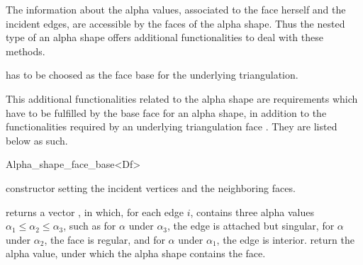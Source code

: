 The information about the alpha values, associated to the face herself and the
incident edges, are accessible by the 
faces of the alpha shape. Thus the nested 
type of an alpha shape offers additional functionalities to deal with these
methods.

 has to be choosed as the face base for the underlying triangulation. 

This additional functionalities related to the alpha shape
are requirements which have to be fulfilled
by the base face  for an alpha shape,
in addition to the functionalities required by an underlying triangulation face .
They are listed below as such.

\ccInheritsFrom


\begin{ccClass}{Alpha_shape_face_base<Df>}

\ccTypes



\ccCreation

\begin{ccAdvanced}

\ccGlue
{}
\ccGlue
{} 
{constructor setting the incident vertices and the neighboring faces.}

\end{ccAdvanced}

{returns a vector , in which, for each edge $i$,  contains
three alpha values
 $\alpha_1 \leq \alpha_2 \leq \alpha_3$, such as for
$\alpha$ under $\alpha_3$, the edge is attached but singular,
for $\alpha$ under $\alpha_2$, the face is regular, and for $\alpha$
under $\alpha_1$, the edge is interior.}
{return the alpha value, under which the alpha shape contains the
face.}


\end{ccClass}
